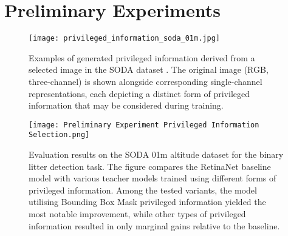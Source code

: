 \graphicspath{{content/appendices/figures/}}

\chapter{Preliminary Experiments}

\vfill
\begin{figure}[!htbp]
    \centering%
    \texttt{[image: privileged\_information\_soda\_01m.jpg]}
    \caption{Examples of generated privileged information derived from a selected image in the SODA dataset \cite{soda_dataset}. The original image (RGB, three-channel) is shown alongside corresponding single-channel representations, each depicting a distinct form of privileged information that may be considered during training.}
    \label{fig:channels}
\end{figure}
\vfill
\vfill
\begin{figure}[!htbp]
    \centering
    \texttt{[image: Preliminary Experiment Privileged Information Selection.png]}
    \caption{Evaluation results on the SODA 01m altitude dataset for the binary litter detection task. The figure compares the RetinaNet baseline model with various teacher models trained using different forms of privileged information. Among the tested variants, the model utilising Bounding Box Mask privileged information yielded the most notable improvement, while other types of privileged information resulted in only marginal gains relative to the baseline.}
    \label{fig:preliminary_privileged}
\end{figure}
\vfill